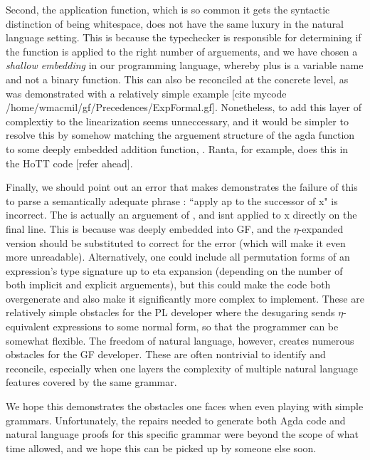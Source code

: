 Second, the application function, which is so common it gets the syntactic
distinction of being whitespace, does not have the same luxury in the natural
language setting. This is because the typechecker is responsible for determining
if the function is applied to the right number of arguements, and we have chosen
a \emph{shallow embedding} in our programming language, whereby plus is a
variable name and not a binary function. This can also be reconciled at the
concrete level, as was demonstrated with a relatively simple example [cite
mycode /home/wmacmil/gf/Precedences/ExpFormal.gf]. Nonetheless, to add this
layer of complextiy to the linearization seems unneccessary, and it would be
simpler to resolve this by somehow matching the arguement structure of the agda
function to some deeply embedded addition function, .
Ranta, for example, does this in the HoTT code [refer ahead].

Finally, we should point out an error that makes demonstrates the failure of
this to parse a semantically adequate phrase : ``apply ap to the successor of x"
is incorrect. The  is actually an arguement of , and
isnt applied to x directly on the final line. This is because
 was deeply embedded into GF, and the $\eta$-expanded version should be
substituted to correct for the error (which will make it even more unreadable).
Alternatively, one could include all permutation forms of an expression's type
signature up to eta expansion (depending on the number of both implicit and
explicit arguements), but this could make the code both overgenerate and also
make it significantly more complex to implement. These are relatively simple
obstacles for the PL developer where the desugaring sends $\eta$-equivalent
expressions to some normal form, so that the programmer can be somewhat
flexible. The freedom of natural language, however, creates numerous obstacles
for the GF developer. These are often nontrivial to identify and reconcile,
especially when one layers the complexity of multiple natural language features
covered by the same grammar.

We hope this demonstrates the obstacles one faces when even playing with simple
grammars. Unfortunately, the repairs needed to generate both Agda code and
natural language proofs for this specific grammar were beyond the scope of what
time allowed, and we hope this can be picked up by someone else soon.
